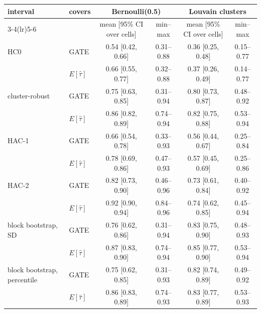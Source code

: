 \begin{tabular}{llcccc}
\toprule
interval & covers & \multicolumn{2}{c}{Bernoulli(0.5)} & \multicolumn{2}{c}{Louvain clusters} \\
\cmidrule(lr){3-4}\cmidrule(lr){5-6}
 & & mean [95\% CI over cells] & min--max & mean [95\% CI over cells] & min--max \\
\midrule
HC0 & GATE & 0.54 [0.42, 0.66] & 0.31--0.88 & 0.36 [0.25, 0.48] & 0.15--0.77 \\
 & $E[\hat\tau]$ & 0.66 [0.55, 0.77] & 0.32--0.88 & 0.37 [0.26, 0.49] & 0.14--0.77 \\
\addlinespace
cluster-robust & GATE & 0.75 [0.63, 0.85] & 0.31--0.94 & 0.80 [0.73, 0.87] & 0.48--0.92 \\
 & $E[\hat\tau]$ & 0.86 [0.82, 0.89] & 0.74--0.94 & 0.82 [0.75, 0.88] & 0.53--0.94 \\
\addlinespace
HAC-1 & GATE & 0.66 [0.54, 0.78] & 0.33--0.93 & 0.56 [0.44, 0.67] & 0.25--0.84 \\
 & $E[\hat\tau]$ & 0.78 [0.69, 0.86] & 0.47--0.93 & 0.57 [0.45, 0.69] & 0.25--0.86 \\
\addlinespace
HAC-2 & GATE & 0.82 [0.73, 0.90] & 0.46--0.96 & 0.73 [0.61, 0.84] & 0.40--0.92 \\
 & $E[\hat\tau]$ & 0.92 [0.90, 0.94] & 0.84--0.96 & 0.74 [0.62, 0.85] & 0.45--0.94 \\
\addlinespace
block bootstrap, SD & GATE & 0.76 [0.62, 0.86] & 0.31--0.94 & 0.83 [0.75, 0.90] & 0.48--0.93 \\
 & $E[\hat\tau]$ & 0.87 [0.83, 0.90] & 0.74--0.94 & 0.85 [0.77, 0.90] & 0.53--0.94 \\
\addlinespace
block bootstrap, percentile & GATE & 0.75 [0.62, 0.85] & 0.31--0.93 & 0.82 [0.74, 0.89] & 0.49--0.92 \\
 & $E[\hat\tau]$ & 0.86 [0.83, 0.89] & 0.74--0.93 & 0.83 [0.77, 0.89] & 0.53--0.93 \\
\bottomrule
\end{tabular}
